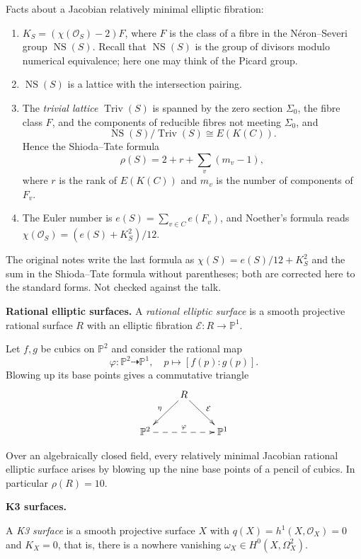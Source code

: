 Facts about a Jacobian relatively minimal
elliptic fibration:
\begin{enumerate}
\item $K_S=(\chi(\mathcal{O}_S)-2)F$, where
$F$ is the class of a fibre in the
Néron--Severi group $\operatorname{NS}(S)$.
Recall that $\operatorname{NS}(S)$ is the
group of divisors modulo numerical
equivalence; here one may think of the
Picard group.
\item $\operatorname{NS}(S)$ is a lattice
with the intersection pairing.
\item The \emph{trivial lattice}
$\operatorname{Triv}(S)$ is spanned by the
zero section $\Sigma_0$, the fibre class
$F$, and the components of reducible fibres
not meeting $\Sigma_0$, and
$$
\operatorname{NS}(S)/\operatorname{Triv}(S)
\cong E(K(C)).
$$
Hence the Shioda--Tate formula
$$
\rho(S)=2+r+\sum_v (m_v-1),
$$
where $r$ is the rank of $E(K(C))$ and $m_v$
is the number of components of $F_v$.
\item The Euler number is
$e(S)=\sum_{v\in C}e(F_v)$, and Noether's
formula reads
$\chi(\mathcal{O}_S)=(e(S)+K_S^2)/12$.
\end{enumerate}
The original notes write the last formula
as $\chi(S)=e(S)/12+K_S^2$ and the sum in
the Shioda--Tate formula without
parentheses; both are corrected here to the
standard forms. Not checked against the
talk.

\medskip\noindent
{\bf Rational elliptic surfaces.} A
\emph{rational elliptic surface} is a
smooth projective rational surface $R$ with
an elliptic fibration
$\mathcal{E}\colon R\to\mathbb{P}^1$.

\begin{example}
\label{example-zingali-cubic-pencil}
Let $f,g$ be cubics on $\mathbb{P}^2$ and
consider the rational map
$$
\varphi\colon \mathbb{P}^2
\dashrightarrow \mathbb{P}^1,
\quad
p\longmapsto [f(p):g(p)].
$$
Blowing up its base points gives a
commutative triangle
$$
\xymatrix{
& R \ar[ld]_{\eta} \ar[rd]^{\mathcal{E}} & \\
\mathbb{P}^2 \ar@{-->}[rr]^{\varphi}
& & \mathbb{P}^1
}
$$
\end{example}

Over an algebraically closed field, every
relatively minimal Jacobian rational
elliptic surface arises by blowing up the
nine base points of a pencil of cubics. In
particular $\rho(R)=10$.

\medskip\noindent
{\bf K3 surfaces.}

\begin{definition}
\label{definition-zingali-k3}
A \emph{K3 surface} is a smooth projective
surface $X$ with
$q(X)=h^1(X,\mathcal{O}_X)=0$ and
$K_X=0$, that is, there is a nowhere
vanishing $\omega_X\in H^0(X,\Omega^2_X)$.
\end{definition}

